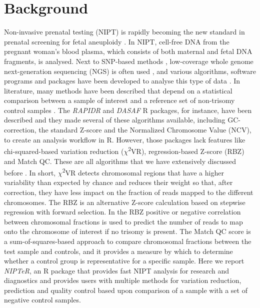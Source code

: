 \section{Background}\label{Background}
Non-invasive prenatal testing (NIPT) is rapidly becoming the new standard in prenatal screening for fetal aneuploidy \cite{Allyse_2015}. 
In NIPT, cell-free DNA from the pregnant woman’s blood plasma, which consists of both maternal and fetal DNA fragments, is analysed. 
Next to SNP-based methods \cite{Hall_2014}, low-coverage whole genome next-generation sequencing (NGS) is often used \cite{Chiu_2008,Sehnert_2011}, and various algorithms, software programs and packages have been developed to analyse this type of data \cite{Chen_2011b, Straver_2013, Yang_2017, Sauk_2018, Phan_2018}. 
In literature, many methods have been described that depend on a statistical comparison between a sample of interest and a reference set of non-trisomy control samples \cite{Chiu_2008,Sehnert_2011,Fan_2010,Johansson_2017}. 
The \textsl{RAPIDR} and \textsl{DASAF} R packages, for instance, have been described \cite{Lo_2014,Liu_2016} and they made several of these algorithms available, including GC-correction, the standard Z-score and the Normalized Chromosome Value (NCV), to create an analysis workflow in R. 
However, those packages lack features like chi-squared-based variation reduction ($\chi$\textsuperscript{2}VR), regression-based Z-score (RBZ) and Match QC. 
These are all algorithms that we have extensively discussed before \cite{Johansson_2017}. 
In short, $\chi$\textsuperscript{2}VR detects chromosomal regions that have a higher variability than expected by chance and reduces their weight so that, after correction, they have less impact on the fraction of reads mapped to the different chromosomes. 
The RBZ is an alternative Z-score calculation based on stepwise regression with forward selection. 
In the RBZ positive or negative correlation between chromosomal fractions is used to predict the number of reads to map onto the chromosome of interest if no trisomy is present. 
The Match QC score is a sum-of-squares-based approach to compare chromosomal fractions between the test sample and controls, and it provides a measure by which to determine whether a control group is representative for a specific sample. 
Here we report \textsl{NIPTeR}, an R package that provides fast NIPT analysis for research and diagnostics and provides users with multiple methods for variation reduction, prediction and quality control based upon comparison of a sample with a set of negative control samples.

